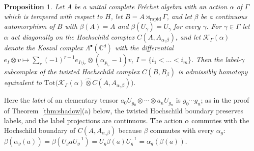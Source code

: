 \documentclass[11pt]{amsart}
\newtheorem{proposition}[theorem]{Proposition}
\theoremstyle{definition}
\theoremstyle{remark}
\newcommand{\C}{\mathbb C}
\begin{document}
\begin{proposition}\label{prop:crossed}
Let $A$ be a unital complete Fr\'echet algebra with an action $\alpha$ of
$\Gamma$ which is tempered with respect to $H$, let
$B=A\rtimes_{\mathrm{rapid}}\Gamma$, and let $\beta$ be a continuous
automorphism of $B$ with $\beta(A)=A$ and $\beta(U_{\gamma})=U_{\gamma}$ for
every $\gamma$.  For $\gamma\in\Gamma$ let $\alpha$ act diagonally on the
Hochschild complex $C(A,A_{\alpha_{\gamma}\beta})$, and let
$\mathcal K_{\Gamma}(\alpha)$ denote the Koszul complex
$\Lambda^{\bullet}(\C^{d})$ with the differential
$e_I\otimes v\mapsto\sum_{r}(-1)^{r-1}e_{I\setminus i_r}\otimes
(\alpha_{p_{i_r}}-1)v$, $I=\{i_1<\dots<i_m\}$.  Then the label-$\gamma$
subcomplex of the twisted Hochschild complex $C(B,B_{\beta})$ is
admissibly homotopy equivalent to
$\mathrm{Tot}\bigl(\mathcal K_{\Gamma}(\alpha)\widehat\otimes
C(A,A_{\alpha_{\gamma}\beta})\bigr)$.
\end{proposition}

Here the \emph{label} of an elementary tensor $a_0U_{g_0}\otimes\cdots\otimes
a_nU_{g_n}$ is $g_0\cdots g_n$; as in the proof of Theorem~\ref{thm:shadow}(a)
below, the twisted Hochschild boundary preserves labels, and the label
projections are continuous.  The action $\alpha$ commutes with the
Hochschild boundary of $C(A,A_{\alpha_{\gamma}\beta})$ because $\beta$
commutes with every $\alpha_g$: $\beta(\alpha_g(a))=\beta(U_gaU_g^{-1})=
U_g\beta(a)U_g^{-1}=\alpha_g(\beta(a))$.
\end{document}
